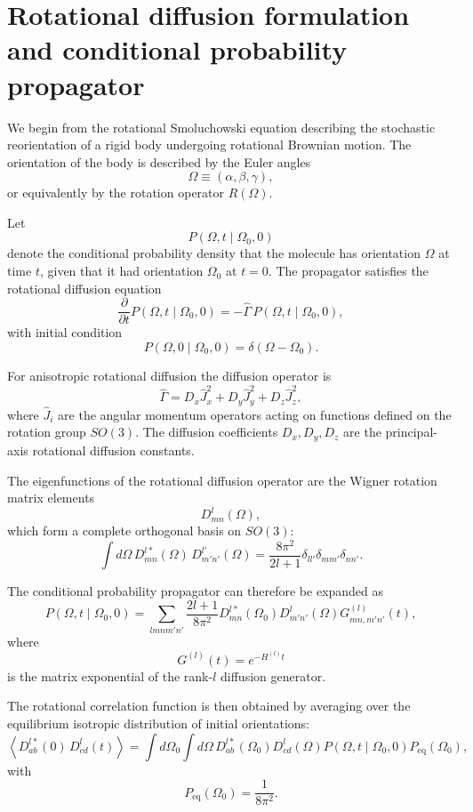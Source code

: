 \documentclass[11pt]{article}
\begin{document}
\section{Rotational diffusion formulation and conditional probability propagator}

We begin from the rotational Smoluchowski equation describing the stochastic
reorientation of a rigid body undergoing rotational Brownian motion. The
orientation of the body is described by the Euler angles
\[
\Omega \equiv (\alpha,\beta,\gamma),
\]
or equivalently by the rotation operator \(R(\Omega)\).

Let
\[
P(\Omega,t \mid \Omega_0,0)
\]
denote the conditional probability density that the molecule has orientation
\(\Omega\) at time \(t\), given that it had orientation \(\Omega_0\) at
\(t=0\). The propagator satisfies the rotational diffusion equation
\[
\frac{\partial}{\partial t}
P(\Omega,t\mid\Omega_0,0)
=
-\hat{\Gamma}\,
P(\Omega,t\mid\Omega_0,0),
\]
with initial condition
\[
P(\Omega,0\mid\Omega_0,0)
=
\delta(\Omega-\Omega_0).
\]

For anisotropic rotational diffusion the diffusion operator is
\[
\hat{\Gamma}
=
D_x \hat{J}_x^2
+
D_y \hat{J}_y^2
+
D_z \hat{J}_z^2,
\]
where \(\hat{J}_i\) are the angular momentum operators acting on functions
defined on the rotation group \(SO(3)\). The diffusion coefficients
\(D_x,D_y,D_z\) are the principal-axis rotational diffusion constants.

The eigenfunctions of the rotational diffusion operator are the Wigner
rotation matrix elements
\[
D^l_{mn}(\Omega),
\]
which form a complete orthogonal basis on \(SO(3)\):
\[
\int d\Omega\,
D^{l*}_{mn}(\Omega)\,
D^{l'}_{m'n'}(\Omega)
=
\frac{8\pi^2}{2l+1}
\delta_{ll'}
\delta_{mm'}
\delta_{nn'}.
\]

The conditional probability propagator can therefore be expanded as
\[
P(\Omega,t\mid\Omega_0,0)
=
\sum_{lmnm'n'}
\frac{2l+1}{8\pi^2}
D^{l*}_{mn}(\Omega_0)
D^l_{m'n'}(\Omega)
G^{(l)}_{mn,m'n'}(t),
\]
where
\[
G^{(l)}(t)=e^{-H^{(l)}t}
\]
is the matrix exponential of the rank-\(l\) diffusion generator.

The rotational correlation function is then obtained by averaging over the
equilibrium isotropic distribution of initial orientations:
\[
\left\langle
D^{l*}_{ab}(0)\,
D^l_{cd}(t)
\right\rangle
=
\int d\Omega_0
\int d\Omega\,
D^{l*}_{ab}(\Omega_0)
D^l_{cd}(\Omega)
P(\Omega,t\mid\Omega_0,0)
P_{\mathrm{eq}}(\Omega_0),
\]
with
\[
P_{\mathrm{eq}}(\Omega_0)=\frac{1}{8\pi^2}.
\]
\end{document}
